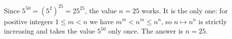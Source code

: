 Since $5^{50}=\left(5^2\right)^{25}=25^{25}$, the value $n=25$ works. It is the only one: for positive integers $1\le m<n$ we have $m^m<n^m\le n^n$, so $n\mapsto n^n$ is strictly increasing and takes the value $5^{50}$ only once. The answer is $n=\boxed{25}$.
